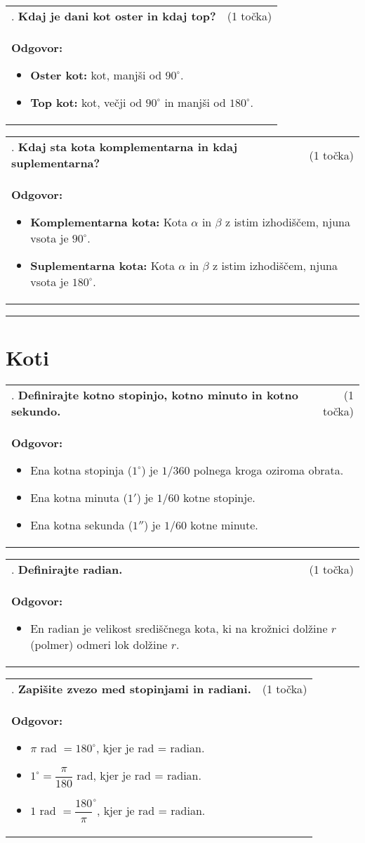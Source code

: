 \documentclass[12pt]{article}
\newcounter{vprasanje}[section]
\renewcommand{\thevprasanje}{\roman{vprasanje}}
\newcommand{\vprasanje}[2]{%
  \stepcounter{vprasanje}%
  \textbf{\thevprasanje}. \textbf{#1} & (#2) \\
}
\newcommand{\odgovor}[1]{%
  \multicolumn{2}{p{\dimexpr\textwidth-2\tabcolsep\relax}}{%
    \small \textbf{Odgovor:} #1%
  } \\[1em]%
}
\newcommand{\crta}{\rule{\textwidth}{0.4pt}}
\newcommand{\naslov}[1]{%
  \vspace{1em} 
  \section{#1}
  \addcontentsline{toc}{section}{\protect\numberline{}#1}%
}
\newcommand{\razmak}[1]{%
  \vspace{#1}
}
\begin{document}
\begin{tabularx}{\textwidth}{X r}
\vprasanje{Kdaj je dani kot oster in kdaj top?}{1 točka}
\odgovor{%
\begin{itemize}
  \item \textbf{Oster kot:} kot, manjši od $90^\circ$.
  \item \textbf{Top kot:} kot, večji od $90^\circ$ in manjši od $180^\circ$.
\end{itemize}
}
\end{tabularx}

\begin{tabularx}{\textwidth}{X r}
\vprasanje{Kdaj sta kota komplementarna in kdaj suplementarna?}{1 točka}
\odgovor{%
\begin{itemize}
  \item \textbf{Komplementarna kota:} Kota $\alpha$ in $\beta$ z istim izhodiščem, njuna vsota je $90^\circ$.
  \item \textbf{Suplementarna kota:} Kota $\alpha$ in $\beta$ z istim izhodiščem, njuna vsota je $180^\circ$.
\end{itemize}
}
\end{tabularx}

\razmak{0.5em}


\crta

\naslov{Koti}

\begin{tabularx}{\textwidth}{X r}
\vprasanje{Definirajte kotno stopinjo, kotno minuto in kotno sekundo.}{1 točka}
\odgovor{
\begin{itemize}
    \item Ena kotna stopinja ($1^\circ$) je $1/360$ polnega kroga oziroma obrata.
    \item Ena kotna minuta ($1'$) je $1/60$ kotne stopinje.
    \item Ena kotna sekunda ($1''$) je $1/60$ kotne minute.
\end{itemize}
}
\end{tabularx}

\begin{tabularx}{\textwidth}{X r}
\vprasanje{Definirajte radian.}{1 točka}
\odgovor{
\begin{itemize}
    \item En radian je velikost središčnega kota, ki na krožnici dolžine $r$ (polmer) odmeri lok dolžine $r$.
\end{itemize}
}
\end{tabularx}

\begin{tabularx}{\textwidth}{X r}
\vprasanje{Zapišite zvezo med stopinjami in radiani.}{1 točka}
\odgovor{
\begin{itemize}
    \item $\pi$ rad $= 180^\circ$, kjer je rad = radian.
    \item $1^\circ = \dfrac{\pi}{180}$ rad, kjer je rad = radian.
    \item $1$ rad $= \dfrac{180}{\pi}^\circ$, kjer je rad = radian.
\end{itemize}
}
\end{tabularx}
\end{document}
